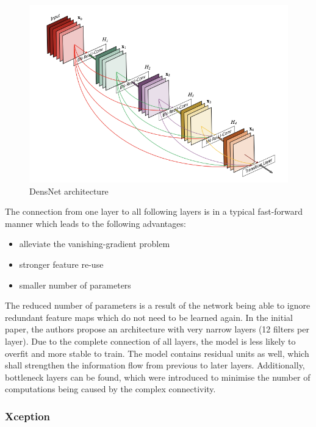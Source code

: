 \begin{figure}[ht]
  \centering
  \includegraphics[width=\linewidth]{figures/densenet.png}
  \caption{DensNet architecture}
  \label{densnet}
\end{figure}

The connection from one layer to all following layers is in a typical fast-forward manner which leads to the following advantages:
\begin{itemize}
  \item alleviate the vanishing-gradient problem
  \item stronger feature re-use
  \item smaller number of parameters
\end{itemize}

The reduced number of parameters is a result of the network being able to ignore redundant feature maps which do not need to be learned again. In the initial paper, the authors propose an architecture with very narrow layers (12 filters per layer)\cite{huang2018densely}. Due to the complete connection of all layers, the model is less likely to overfit and more stable to train.
The model contains residual units as well, which shall strengthen the information flow from previous to later layers. Additionally, bottleneck layers can be found, which were introduced to minimise the number of computations being caused by the complex connectivity.

\subsubsection{Xception}\label{chapter_xception}

